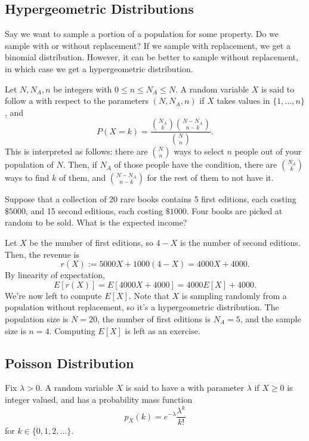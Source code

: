 \documentclass[11pt]{article}
\begin{document}
\subsection{Hypergeometric Distributions}

Say we want to sample a portion of a population for some property. Do we sample with or without replacement? If we sample with replacement, we get a binomial distribution. However, it can be better to sample without replacement, in which case we get a hypergeometric distribution.

\begin{defn}
Let $N,N_A,n$ be integers with $0 \leq n\leq N_A\leq N$. A random variable $X$ is said to follow a  with respect to the parameters $(N,N_A,n)$ if $X$ takes values in $\{1,\dots,n\}$, and
\[
P(X=k)=\frac{\binom{N_A}{k}\binom{N-N_A}{n-k}}{\binom{N}{n}}.
\]
This is interpreted as follows: there are $\binom{N}{n}$ ways to select $n$ people out of your population of $N$. Then, if $N_A$ of those people have the condition, there are $\binom{N_A}{k}$ ways to find $k$ of them, and $\binom{N-N_A}{n-k}$ for the rest of them to not have it. 
\end{defn}

\begin{ex}
Suppose that a collection of 20 rare books contains 5 first editions, each costing $\$5000$, and 15 second editions, each costing $\$1000$. Four books are picked at random to be sold. What is the expected income?
\end{ex}

\begin{solution}
Let $X$ be the number of first editions, so $4-X$ is the number of second editions. Then, the revenue is
\[
r(X):=5000X+1000(4-X)=4000X+4000.
\]
By linearity of expectation,
\[
E[r(X)]=E[4000X+4000]=4000E[X]+4000.
\]
We're now left to compute $E[X]$. Note that $X$ is sampling randomly from a population without replacement, so it's a hypergeometric distribution. The population size is $N=20$, the number of first editions is $N_A=5$, and the sample size is $n=4$. Computing $E[X]$ is left as an exercise.
\end{solution}

\subsection{Poisson Distribution}

\begin{defn}
Fix $\lambda >0$. A random variable $X$ is said to have a  with parameter $\lambda$ if $X \geq 0$ is integer valued, and has a probability mass function
\[
p_X(k)=e^{-\lambda}\frac{\lambda^k}{k!}
\]
for $k \in \{0,1,2,\dots\}$.
\end{defn}
\end{document}
